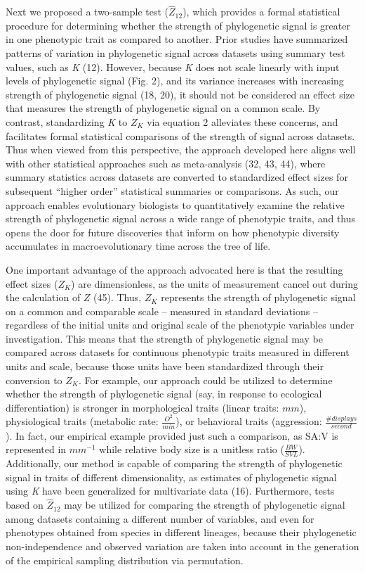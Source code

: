 \documentclass[9pt,twocolumn,twoside,lineno]{pnas-new}
\begin{document}
Next we proposed a two-sample test (\(\hat{Z}_{12}\)), which provides a
formal statistical procedure for determining whether the strength of
phylogenetic signal is greater in one phenotypic trait as compared to
another. Prior studies have summarized patterns of variation in
phylogenetic signal across datasets using summary test values, such as
\emph{K} (12). However, because \emph{K} does not scale linearly with
input levels of phylogenetic signal (Fig. 2), and its variance increases
with increasing strength of phylogenetic signal (18, 20), it should not
be considered an effect size that measures the strength of phylogenetic
signal on a common scale. By contrast, standardizing \emph{K} to \(Z_K\)
via equation 2 alleviates these concerns, and facilitates formal
statistical comparisons of the strength of signal across datasets. Thus
when viewed from this perspective, the approach developed here aligns
well with other statistical approaches such as meta-analysis (32, 43,
44), where summary statistics across datasets are converted to
standardized effect sizes for subsequent ``higher order'' statistical
summaries or comparisons. As such, our approach enables evolutionary
biologists to quantitatively examine the relative strength of
phylogenetic signal across a wide range of phenotypic traits, and thus
opens the door for future discoveries that inform on how phenotypic
diversity accumulates in macroevolutionary time across the tree of life.

One important advantage of the approach advocated here is that the
resulting effect sizes (\(Z_K\)) are dimensionless, as the units of
measurement cancel out during the calculation of \(Z\) (45). Thus,
\(Z_K\) represents the strength of phylogenetic signal on a common and
comparable scale -- measured in standard deviations -- regardless of the
initial units and original scale of the phenotypic variables under
investigation. This means that the strength of phylogenetic signal may
be compared across datasets for continuous phenotypic traits measured in
different units and scale, because those units have been standardized
through their conversion to \(Z_K\). For example, our approach could be
utilized to determine whether the strength of phylogenetic signal (say,
in response to ecological differentiation) is stronger in morphological
traits (linear traits: \(mm\)), physiological traits (metabolic rate:
\(\frac{O^2}{min}\)), or behavioral traits (aggression:
\(\frac{\#{displays}}{second}\)). In fact, our empirical example
provided just such a comparison, as SA:V is represented in \(mm^{-1}\)
while relative body size is a unitless ratio (\(\frac{BW}{SVL}\)).
Additionally, our method is capable of comparing the strength of
phylogenetic signal in traits of different dimensionality, as estimates
of phylogenetic signal using \emph{K} have been generalized for
multivariate data (16). Furthermore, tests based on \(\hat{Z}_{12}\) may
be utilized for comparing the strength of phylogenetic signal among
datasets containing a different number of variables, and even for
phenotypes obtained from species in different lineages, because their
phylogenetic non-independence and observed variation are taken into
account in the generation of the empirical sampling distribution via
permutation.
\end{document}
